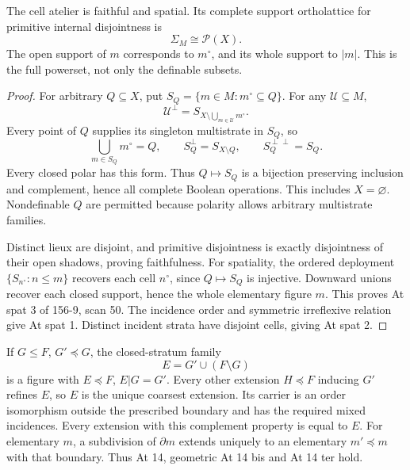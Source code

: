 \begin{theorem}\label{SA21-BM-cell-support}
The cell atelier is faithful and spatial. Its complete
support ortholattice for primitive internal disjointness is
\[
 \Sigma_M\cong\mathcal P(X).
\]
The open support of \(m\) corresponds to \(m^\circ\),
and its whole support to \(|m|\). This is the full
powerset, not only the definable subsets.
\end{theorem}

\begin{proof}
For arbitrary \(Q\subseteq X\), put
\(S_Q=\{m\in M:m^\circ\subseteq Q\}\).
For any \(\mathcal U\subseteq M\),
\[
 \mathcal U^\perp
 =S_{X\setminus\bigcup_{m\in\mathcal U}m^\circ}.
\]
Every point of \(Q\) supplies its singleton
multistrate in \(S_Q\), so
\[
 \bigcup_{m\in S_Q}m^\circ=Q,\qquad
 S_Q^\perp=S_{X\setminus Q},\qquad
 S_Q^{\perp\perp}=S_Q.
\]
Every closed polar has this form.
Thus \(Q\mapsto S_Q\) is a bijection
preserving inclusion and complement,
hence all complete Boolean operations.
This includes \(X=\varnothing\).
Nondefinable \(Q\) are permitted because
polarity allows arbitrary multistrate
families.

Distinct lieux are disjoint, and
primitive disjointness is exactly
disjointness of their open shadows,
proving faithfulness.
For spatiality, the ordered deployment
\(\{S_{n^\circ}:n\leq m\}\)
recovers each cell \(n^\circ\), since
\(Q\mapsto S_Q\) is injective.
Downward unions recover each closed
support, hence the whole elementary
figure \(m\). This proves
At spat 3 of 156-9, scan 50.
The incidence order and symmetric
irreflexive relation give At spat 1.
Distinct incident strata have
disjoint cells, giving At spat 2.
\end{proof}

\begin{theorem}\label{SA21-BM-cell-extension}
If \(G\leq F\), \(G'\preceq G\), the closed-stratum family
\[
 E=G'\cup(F\setminus G)
\]
is a figure with \(E\preceq F\), \(E|G=G'\).
Every other extension \(H\preceq F\) inducing \(G'\)
refines \(E\), so \(E\) is the unique coarsest extension.
Its carrier is an order isomorphism outside the
prescribed boundary and has the required mixed
incidences. Every extension with this complement
property is equal to \(E\).
For elementary \(m\), a subdivision of \(\partial m\)
extends uniquely to an elementary \(m'\preceq m\)
with that boundary. Thus At 14, geometric
At 14 bis and At 14 ter hold.
\end{theorem}

